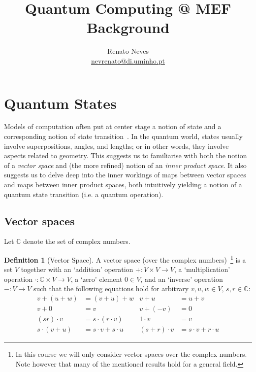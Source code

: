 \documentclass[a4paper, 11pt]{article}
\date{}
\newcommand{\complex}{\mathbb{C}}
\theoremstyle{definition}
\newtheorem{definition}{Definition}
\begin{document}
\title{Quantum Computing @ MEF \\ \large Background}
\author{Renato Neves \\ \scriptsize
  \href{mailto:nevrenato@di.uminho.pt}{nevrenato@di.uminho.pt}}
\maketitle

\section{Quantum States}

Models of computation often put at center stage a notion of state and
a corresponding notion of state transition~\cite{bruni17}. In the
quantum world, states usually involve superpositions, angles, and
lengths; or in other words, they involve aspects related to
geometry. This suggests us to familiarise with both the notion of a
\emph{vector space} and (the more refined) notion of an \emph{inner
  product space}. It also suggests us to delve deep into the inner
workings of maps between vector spaces and maps between inner product
spaces, both intuitively yielding a notion of a quantum state
transition (i.e. a quantum operation).

\subsection{Vector spaces}

Let $\complex$ denote the set of complex numbers.

\begin{definition}[Vector Space]
  A vector space (over the complex numbers)~\footnote{In this course
    we will only consider vector spaces over the complex numbers. Note
    however that many of the mentioned results hold for a general
    field.} is a set $V$ together with an `addition' operation
  $+ : V \times V \to V$, a `multiplication' operation
  $\cdot : \complex \times V \to V$, a `zero' element $0 \in V$, and
  an `inverse' operation $- : V \to V$ such that the following
  equations hold for arbitrary $v,u,w \in V$, $s,r \in \complex$:
  \begin{align*}
    v + (u + w) & = (v + u) + w & v + u & = u + v  \\
    v + 0 & = v & v + (-v) & = 0 \\
    (s r) \cdot v & = s \cdot (r \cdot v) & 1 \cdot v & = v  \\
    s \cdot (v + u) & = s \cdot v + s \cdot u & (s + r) \cdot v & = s \cdot v + r \cdot u
  \end{align*}
\end{definition}
\end{document}
